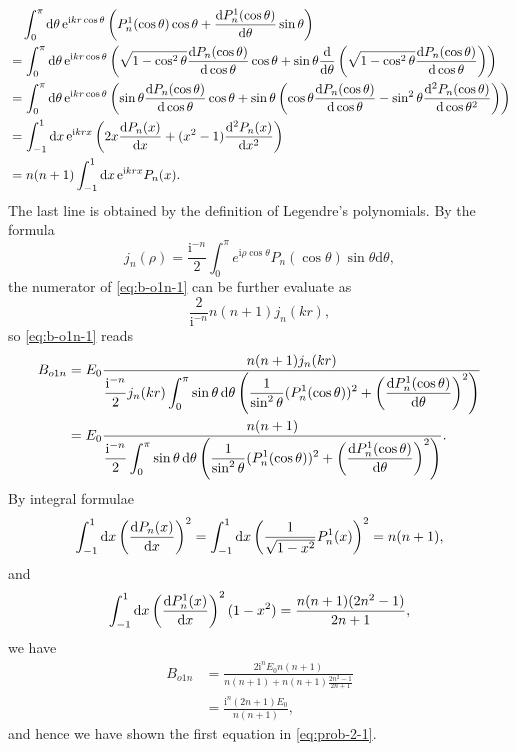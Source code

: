 \documentclass[hyperref, a4paper]{article}
\newcommand*{\ii}{\mathrm{i}}
\newcommand*{\ee}{\mathrm{e}}
\begin{document}
\[
    \begin{aligned}
        &\quad \int_0^\pi \dd{\theta} \ee^{\ii k r \cos \theta} \left( P^1_n(\cos\theta) \cos\theta + \dv{P^1_n(\cos\theta)}{\theta} \sin \theta \right) \\
        &= \int_0^\pi \dd{\theta} \ee^{\ii k r \cos \theta} \left( \sqrt{1 - \cos^2\theta} \dv{P_n(\cos\theta)}{\cos \theta } \cos\theta + \sin \theta \dv{\theta} \left( \sqrt{1 - \cos^2\theta} \dv{P_n(\cos\theta)}{\cos \theta }  \right) \right) \\
        &= \int_0^\pi \dd{\theta} \ee^{\ii k r \cos \theta} \left( \sin\theta \dv{P_n(\cos\theta)}{\cos \theta } \cos\theta + \sin \theta \left( \cos\theta \dv{P_n(\cos\theta)}{\cos\theta} - \sin^2\theta \dv[2]{P_n(\cos\theta)}{\cos\theta} \right) \right) \\
        &= \int_{-1}^1 \dd{x} \ee^{\ii k r x} \left( 2 x \dv{P_n(x)}{x} + (x^2 - 1) \dv[2]{P_n(x)}{x} \right) \\
        &= n(n+1) \int_{-1}^1 \dd{x} \ee^{\ii k r x} P_n(x).
    \end{aligned}
\] 
The last line is obtained by the definition of Legendre's polynomials.
By the formula 
\begin{equation}
    j_{n}(\rho)=\frac{\mathrm{i}^{-n}}{2} \int_{0}^{\pi} e^{\mathrm{i} \rho \cos \theta} P_{n}(\cos \theta) \sin \theta \mathrm{d} \theta ,
\end{equation}
the numerator of \eqref{eq:b-o1n-1} can be further evaluate as 
\[
    \frac{2}{\ii^{-n}} n(n+1) j_n(kr),
\]
so \eqref{eq:b-o1n-1} reads
\begin{equation}
    \begin{aligned}
        B_{o1n} &= E_0 \frac{n(n+1) j_n(kr)}{\displaystyle \frac{\ii^{-n}}{2} j_n(kr) \int_0^\pi \sin \theta \dd{\theta} \left( \frac{1}{\sin^2 \theta} (P^1_n(\cos \theta))^2 + \left( \dv{P_n^1(\cos\theta)}{\theta} \right)^2 \right) } \\
        &= E_0 \frac{n(n+1)}{\displaystyle \frac{\ii^{-n}}{2}  \int_0^\pi \sin \theta \dd{\theta} \left( \frac{1}{\sin^2 \theta} (P^1_n(\cos \theta))^2 + \left( \dv{P_n^1(\cos\theta)}{\theta} \right)^2 \right) }.
    \end{aligned}
\end{equation}
By integral formulae 
\begin{equation}
    \int_{-1}^1 \dd{x} \left( \dv{P_n(x)}{x} \right)^2 = \int_{-1}^1 \dd{x} \left( \frac{1}{\sqrt{1 - x^2}} P_n^1(x) \right)^2 = n(n+1),
\end{equation}
and 
\begin{equation}
    \int_{-1}^1 \dd{x} \left( \dv{P^1_n(x)}{x} \right)^2 (1 - x^2) = \frac{n(n+1)(2n^2-1)}{2n+1},
\end{equation}
we have 
\[
    \begin{aligned}
        B_{o1n} &= \frac{2 \ii^n E_0 n(n+1)}{n(n+1) + n(n+1) \frac{2n^2 - 1}{2n+1}} \\
        &= \frac{\ii^n (2n+1) E_0 }{n(n+1)},
    \end{aligned}
\]
and hence we have shown the first equation in \eqref{eq:prob-2-1}.
\end{document}
